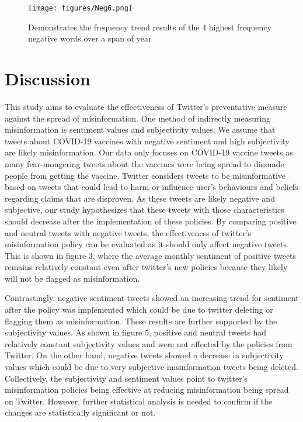 \documentclass[10pt,twocolumn,letterpaper]{article}
\begin{document}
\begin{figure}[H]
  \centering
  \texttt{[image: figures/Neg6.png]}
  \caption{Demonstrates the frequency trend results of the 4 highest frequency negative words over a span of year}
\end{figure}

\section{Discussion}
This study aims to evaluate the effectiveness of Twitter’s preventative measure against the spread of misinformation. One method of indirectly measuring misinformation is sentiment values and subjectivity values. We assume that tweets about COVID-19 vaccines with negative sentiment and high subjectivity are likely misinformation. Our data only focuses on COVID-19 vaccine tweets as many fear-mongering tweets about the vaccines were being spread to dissuade people from getting the vaccine. Twitter considers tweets to be misinformative based on tweets that could lead to harm or influence user’s behaviours and beliefs regarding claims that are disproven. As these tweets are likely negative and subjective, our study hypothesizes that these tweets with those characteristics should decrease after the implementation of these policies. By comparing positive and neutral tweets with negative tweets, the effectiveness of twitter’s misinformation policy can be evaluated as it should only affect negative tweets. This is shown in figure 3, where the average monthly sentiment of positive tweets remains relatively constant even after twitter’s new policies because they likely will not be flagged as misinformation. 

Contrastingly, negative sentiment tweets showed an increasing trend for sentiment after the policy was implemented which could be due to twitter deleting or flagging them as misinformation. These results are further supported by the subjectivity values. As shown in figure 5, positive and neutral tweets had relatively constant subjectivity values and were not affected by the policies from Twitter. On the other hand, negative tweets showed a decrease in subjectivity values which could be due to very subjective misinformation tweets being deleted. Collectively, the subjectivity and sentiment values point to twitter’s misinformation policies being effective at reducing misinformation being spread on Twitter. However, further statistical analysis is needed to confirm if the changes are statistically significant or not. 
\end{document}
